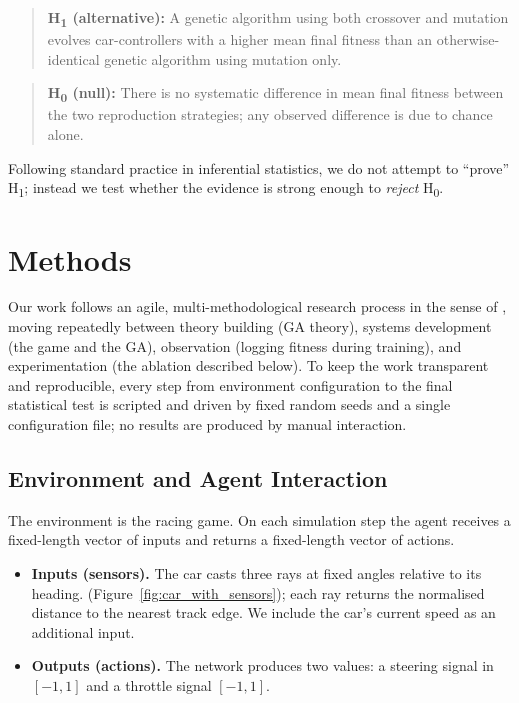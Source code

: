 \documentclass[a4paper, twocolumn]{article}
\begin{document}
\begin{quote}
\textbf{H\textsubscript{1} (alternative):} A genetic algorithm using both crossover and
mutation evolves car-controllers with a higher mean final fitness than an
otherwise-identical genetic algorithm using mutation only.
\end{quote}

\begin{quote}
\textbf{H\textsubscript{0} (null):} There is no systematic difference in mean final fitness
between the two reproduction strategies; any observed difference is due to chance alone.
\end{quote}

Following standard practice in inferential statistics, we do not attempt to ``prove''
H\textsubscript{1}; instead we test whether the evidence is strong enough to \emph{reject}
H\textsubscript{0}.

\section{Methods\label{sec:Methods}}

Our work follows an agile, multi-methodological research process in the sense of
\textcite{nunamaker1990systems}, moving repeatedly between theory building (GA theory),
systems development (the game and the GA), observation (logging fitness during training), and
experimentation (the ablation described below).
To keep the work transparent and reproducible, every step from environment configuration to
the final statistical test is scripted and driven by fixed random seeds and a single configuration
file; no results are produced by manual interaction.


\subsection{Environment and Agent Interaction\label{sec:Environment}}

The environment is the racing game. On each simulation step the agent receives a fixed-length
vector of inputs and returns a fixed-length vector of actions.

\begin{itemize}
    \item \textbf{Inputs (sensors).} The car casts three rays at fixed angles relative to its heading. (Figure~\ref{fig:car_with_sensors});
    each ray returns the normalised distance to the nearest track edge.
    We include the car's current speed as an additional input.
    \item \textbf{Outputs (actions).} The network produces two values:
      a steering signal in $[-1, 1]$ and a throttle signal $[-1, 1]$.
\end{itemize}
\end{document}
